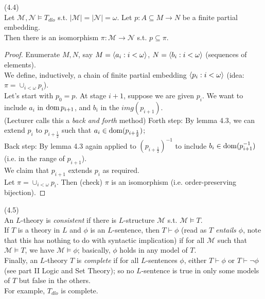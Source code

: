 \documentclass[a4paper]{article}
\begin{document}
\begin{thm} (4.4)\\
    Let $\mathcal{M},\mathcal{N} \vDash T_{dlo}$ s.t. $|\mathcal{M}| = |\mathcal{N}| = \omega$. Let $p:A \subseteq M \to N$ be a finite partial embedding.\\
    Then there is an isomorphism $\pi:\mathcal{M} \to \mathcal{N}$ s.t. $p \subseteq \pi$.
    \begin{proof}
        Enumerate $M,N$, say $M=\langle a_i:i < \omega\rangle$, $N=\langle b_i:i < \omega\rangle$ (sequences of elements).\\
        We define, inductively, a chain of finite partial embedding $\langle p_i:i<\omega\rangle$ (idea: $\pi = \cup_{i<\omega} p_i$).\\
        Let's start with $p_0 = p$. At stage $i+1$, suppose we are given $p_i$. We want to include $a_i$ in $\operatorname{dom} p_{i+1}$, and $b_i$ in the $img(p_{i+1})$.\\
        (Lecturer calls this a \emph{back and forth} method) Forth step: By lemma 4.3, we can extend $p_i$ to $p_{i+\frac{1}{2}}$ such that $a_i \in \operatorname{dom}(p_{i+\frac{1}{2}})$;\\
        Back step: By lemma 4.3 again applied to $(p_{i+\frac{1}{2}})^{-1}$ to include $b_i \in \operatorname{dom} (p_{i+1}^{-1})$ (i.e. in the range of $p_{i+1}$).\\
        We claim that $p_{i+1}$ extends $p_i$ as required.\\
        Let $\pi = \cup_{i < \omega} p_i$. Then (check) $\pi$ is an isomorphism (i.e. order-preserving bijection).
    \end{proof}
\end{thm}

\begin{defi} (4.5)\\
    An $L$-theory is \emph{consistent} if there is $L$-structure $\mathcal{M}$ s.t. $\mathcal{M} \vDash T$.\\
    If $T$ is a theory in $L$ and $\phi$ is an $L$-sentence, then $T \vdash \phi$ (read as \emph{$T$ entails $\phi$}, note that this has nothing to do with syntactic implication) if for all $\mathcal{M}$ such that $\mathcal{M} \vDash T$, we have $\mathcal{M} \vDash \phi$; basically, $\phi$ holds in any model of $T$.\\
    Finally, an $L$-theory $T$ is \emph{complete} if for all $L$-sentences $\phi$, either $T \vdash \phi$ or $T \vdash \neg\phi$ (see part II Logic and Set Theory); so no $L$-sentence is true in only some models of $T$ but false in the others.\\
    For example, $T_{dlo}$ is complete.
\end{defi}
\end{document}
